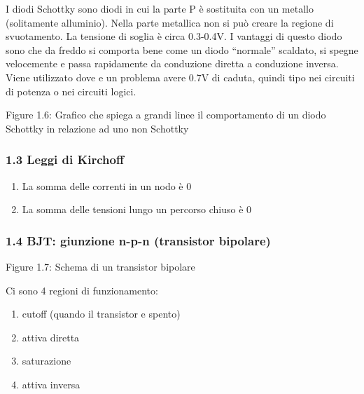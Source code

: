 \documentclass[
]{article}
\providecommand{\tightlist}{%
  \setlength{\itemsep}{0pt}\setlength{\parskip}{0pt}}
\begin{document}
I diodi Schottky sono diodi in cui la parte P è sostituita con un
metallo (solitamente alluminio). Nella parte metallica non si può creare
la regione di svuotamento. La tensione di soglia è circa 0.3-0.4V. I
vantaggi di questo diodo sono che da freddo si comporta bene come un
diodo ``normale'' scaldato, si spegne velocemente e passa rapidamente da
conduzione diretta a conduzione inversa. \newline Viene utilizzato dove
e un problema avere 0.7V di caduta, quindi tipo nei circuiti di potenza
o nei circuiti logici.

Figure 1.6: Grafico che spiega a grandi linee il comportamento di un
diodo Schottky in relazione ad uno non Schottky

\subsubsection{1.3 Leggi di Kirchoff}\label{leggi-di-kirchoff}

\begin{enumerate}
\def\labelenumi{\arabic{enumi}.}
\tightlist
\item
  La somma delle correnti in un nodo è 0
\item
  La somma delle tensioni lungo un percorso chiuso è 0
\end{enumerate}

\subsubsection{1.4 BJT: giunzione n-p-n (transistor
bipolare)}\label{bjt-giunzione-n-p-n-transistor-bipolare}

Figure 1.7: Schema di un transistor bipolare

Ci sono 4 regioni di funzionamento:

\begin{enumerate}
\def\labelenumi{\arabic{enumi}.}
\tightlist
\item
  cutoff (quando il transistor e spento)
\item
  attiva diretta
\item
  saturazione
\item
  attiva inversa
\end{enumerate}
\end{document}
